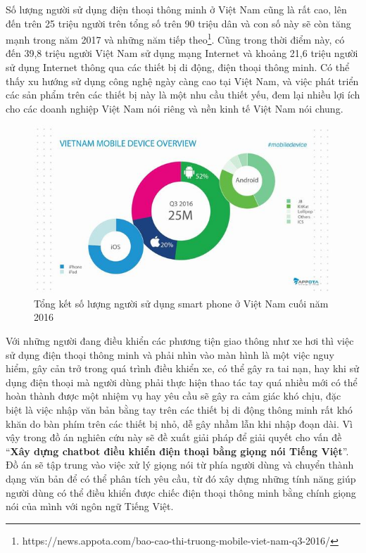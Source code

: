 \documentclass[12pt]{report}
\begin{document}
Số lượng người sử dụng điện thoại thông minh ở Việt Nam cũng là rất cao, lên đến trên 25 triệu người trên tổng số trên 90 triệu dân và con số này sẽ còn tăng mạnh trong năm 2017 và những năm tiếp theo{\footnote{https://news.appota.com/bao-cao-thi-truong-mobile-viet-nam-q3-2016/}}. Cũng trong thời điểm này, có đến 39,8 triệu người Việt Nam sử dụng mạng Internet và khoảng 21,6 triệu người sử dụng Internet thông qua các thiết bị di động, điện thoại thông minh. Có thể thấy xu hướng sử dụng công nghệ ngày càng cao tại Việt Nam, và việc phát triển các sản phẩm trên các thiết bị này là một nhu cầu thiết yếu, đem lại nhiều lợi ích cho các doanh nghiệp Việt Nam nói riêng và nền kinh tế Việt Nam nói chung.

\begin{figure}[H]
  \centering
    \includegraphics[width=15cm]{Pics/Chap1/mobile-vietnam.jpg}
  \caption{Tổng kết số lượng người sử dụng smart phone ở Việt Nam cuối năm 2016}
\end{figure}

Với những người đang điều khiển các phương tiện giao thông như xe hơi thì việc sử dụng điện thoại thông minh và phải nhìn vào màn hình là một việc nguy hiểm, gây cản trở trong quá trình điều khiển xe, có thể gây ra tai nạn, hay khi sử dụng điện thoại mà người dùng phải thực hiện thao tác tay quá nhiều mới có thể hoàn thành được một nhiệm vụ hay yêu cầu sẽ gây ra cảm giác khó chịu, đặc biệt là việc nhập văn bản bằng tay trên các thiết bị di động thông minh rất khó khăn do bàn phím trên các thiết bị nhỏ, dễ gây nhầm lẫn khi nhập đoạn dài. Vì vậy trong đồ án nghiên cứu này sẽ đề xuất giải pháp để giải quyết cho vấn đề ``\textbf{Xây dựng chatbot điều khiển điện thoại bằng giọng nói Tiếng Việt}''. Đồ án sẽ tập trung vào việc xử lý giọng nói từ phía người dùng và chuyển thành dạng văn bản để có thể phân tích yêu cầu, từ đó xây dựng những tính năng giúp người dùng có thể điều khiển được chiếc điện thoại thông minh bằng chính giọng nói của mình với ngôn ngữ Tiếng Việt.
\end{document}
